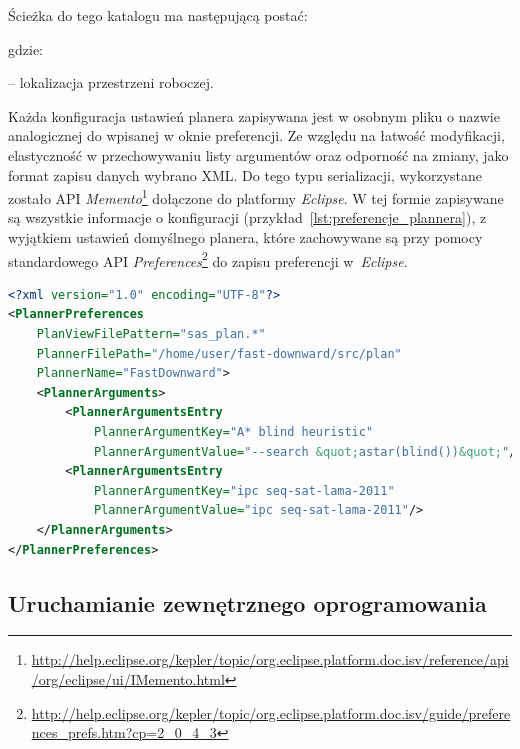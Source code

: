 Ścieżka do tego katalogu ma następującą postać:

\noindent
\centerline{}

\noindent
gdzie:

\noindent
\textbf{} -- lokalizacja przestrzeni roboczej.

Każda konfiguracja ustawień planera zapisywana jest w osobnym pliku o nazwie analogicznej do wpisanej w oknie preferencji. Ze względu na łatwość modyfikacji, elastyczność w przechowywaniu listy argumentów oraz odporność na zmiany, jako format zapisu danych wybrano XML. Do tego typu serializacji, wykorzystane zostało API \emph{Memento}\footnote{\url{http://help.eclipse.org/kepler/topic/org.eclipse.platform.doc.isv/reference/api/org/eclipse/ui/IMemento.html}}\cite{eclipseplugins} dołączone do platformy \emph{Eclipse}. W tej formie zapisywane są wszystkie informacje o konfiguracji (przykład~\ref{lst:preferencje_plannera}), z wyjątkiem ustawień domyślnego planera, które zachowywane są przy pomocy standardowego API \emph{Preferences}\footnote{\url{http://help.eclipse.org/kepler/topic/org.eclipse.platform.doc.isv/guide/preferences_prefs.htm?cp=2_0_4_3}}\cite{eclipseplugins} do zapisu preferencji w~\emph{Eclipse}.

\begin{Code}
\begin{lstlisting}[language=XML,frame=single,label={lst:preferencje_plannera},caption={Przykładowa konfiguracja planera FastDownward w postaci XML}]  % Start your code-block
<?xml version="1.0" encoding="UTF-8"?>
<PlannerPreferences 
	PlanViewFilePattern="sas_plan.*" 
	PlannerFilePath="/home/user/fast-downward/src/plan" 
	PlannerName="FastDownward">
	<PlannerArguments>
		<PlannerArgumentsEntry 
			PlannerArgumentKey="A* blind heuristic" 
			PlannerArgumentValue="--search &quot;astar(blind())&quot;"/>
		<PlannerArgumentsEntry 
			PlannerArgumentKey="ipc seq-sat-lama-2011" 
			PlannerArgumentValue="ipc seq-sat-lama-2011"/>
	</PlannerArguments>
</PlannerPreferences>
\end{lstlisting}
\end{Code}

\subsection{Uruchamianie zewnętrznego oprogramowania}
\label{subsec:uruchamianie}

